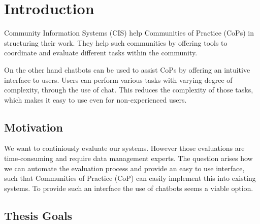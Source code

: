 \chapter{Introduction}
Community Information Systems (CIS) help Communities of Practice (CoPs) in structuring their work. They help such communities by offering tools to coordinate and evaluate different tasks within the community.

On the other hand chatbots can be used to assist CoPs by offering an intuitive interface to users. Users can perform various tasks with varying degree of complexity, through the use of chat. This reduces the complexity of those tasks, which makes it easy to use even for non-experienced users.

\section{Motivation}
We want to continiously evaluate our systems. However those evaluations are time-consuming and require data management experts. The question arises how we can automate the evaluation process and provide an easy to use interface, such that Communities of Practice (CoP) can easily implement this into existing systems.
To provide such an interface the use of chatbots seems a viable option.


\newpage

\section{Thesis Goals}

\blankpage
